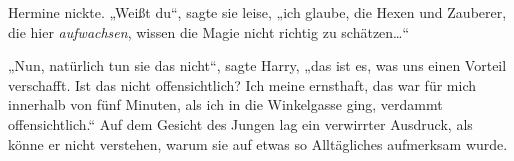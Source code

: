 Hermine nickte. „Weißt du“, sagte sie leise, „ich glaube, die Hexen und Zauberer, die hier \emph{aufwachsen}, wissen die Magie nicht richtig zu schätzen…“

„Nun, natürlich tun sie das nicht“, sagte Harry, „das ist es, was uns einen Vorteil verschafft. Ist das nicht offensichtlich? Ich meine ernsthaft, das war für mich innerhalb von fünf Minuten, als ich in die Winkelgasse ging, verdammt offensichtlich.“ Auf dem Gesicht des Jungen lag ein verwirrter Ausdruck, als könne er nicht verstehen, warum sie auf etwas so Alltägliches aufmerksam wurde.

